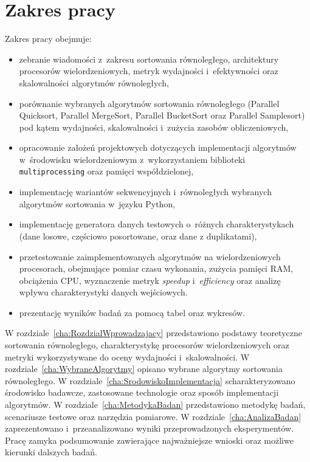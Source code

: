 \section*{Zakres pracy}

Zakres pracy obejmuje:

\begin{itemize}
    \item zebranie wiadomości z~zakresu sortowania równoległego, architektury procesorów wielordzeniowych, metryk wydajności 
    i~efektywności oraz skalowalności algorytmów równoległych,

    \item porównanie wybranych algorytmów sortowania równoległego (Parallel Quicksort, Parallel MergeSort, Parallel BucketSort oraz 
    Parallel Samplesort) pod kątem wydajności, skalowalności i~zużycia zasobów obliczeniowych,

    \item opracowanie założeń projektowych dotyczących implementacji algorytmów w~środowisku wielordzeniowym z~wykorzystaniem 
    biblioteki \texttt{multiprocessing} oraz pamięci współdzielonej,

    \item implementację wariantów sekwencyjnych i~równoległych wybranych algorytmów sortowania w~języku Python,

    \item implementację generatora danych testowych o~różnych charakterystykach (dane losowe, częściowo posortowane, oraz dane z duplikatami),

    \item przetestowanie zaimplementowanych algorytmów na wielordzeniowych procesorach, obejmujące pomiar czasu wykonania, zużycia pamięci RAM, 
    obciążenia CPU, wyznaczenie metryk \textit{speedup} i~\textit{efficiency} oraz analizę wpływu charakterystyki danych wejściowych.

    \item prezentację wyników badań za pomocą tabel oraz wykresów.
\end{itemize}

W rozdziale~\ref{cha:RozdzialWprowadzajacy} przedstawiono podstawy teoretyczne sortowania równoległego, 
charakterystykę procesorów wielordzeniowych oraz metryki wykorzystywane do oceny wydajności i~skalowalności.  
W rozdziale~\ref{cha:WybraneAlgorytmy} opisano wybrane algorytmy sortowania równoległego.  
W rozdziale~\ref{cha:SrodowiskoImplementacja} scharakteryzowano środowisko badawcze, zastosowane technologie oraz 
sposób implementacji algorytmów.  
W rozdziale~\ref{cha:MetodykaBadan} przedstawiono metodykę badań, scenariusze testowe oraz narzędzia pomiarowe.  
W rozdziale~\ref{cha:AnalizaBadan} zaprezentowano i~przeanalizowano wyniki przeprowadzonych eksperymentów.  
Pracę zamyka podsumowanie zawierające najważniejsze wnioski oraz możliwe kierunki dalszych badań.